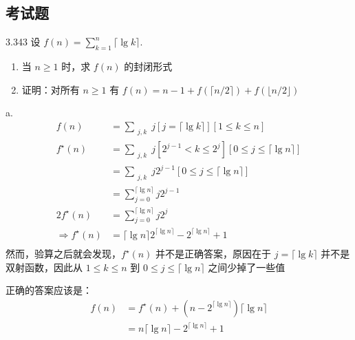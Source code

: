 \subsection{考试题}

\begin{problem}{3.34}{3}
  设 \( f(n) = \sum_{k=1}^n \lceil \lg{k} \rceil. \)
  \begin{enumerate}
    \item[a] 当 \( n \ge 1 \) 时，求 \( f(n) \) 的封闭形式
    \item[b] 证明：对所有 \( n \ge 1 \) 有 \( f(n) = n - 1 + f(\lceil n/2 \rceil) + f(\lfloor n/2 \rfloor) \)
  \end{enumerate}
\end{problem}

a.
\begin{align*}
  f(n) &= \sum_{\substack{j, k}} j [j = \lceil \lg{k} \rceil] [1 \le k \le n] \\
  f^\star (n) &= \sum_{\substack{j, k}} j [2^{j-1} < k \le 2^j] [0 \le j \le \lceil \lg{n} \rceil] \\
  &= \sum_{\substack{j, k}} j 2^{j-1} [0 \le j \le \lceil \lg{n} \rceil] \\
  &= \sum_{j=0}^{\lceil \lg{n} \rceil} j 2^{j-1} \\
  2f^\star (n) &= \sum_{j=0}^{\lceil \lg{n} \rceil} j 2^j \\
  \Rightarrow f^\star (n) &= \lceil \lg{n} \rceil 2^{\lceil \lg{n} \rceil} - 2^{\lceil \lg{n} \rceil} + 1 \\
\end{align*}
然而，验算之后就会发现，\( f^\star (n) \) 并不是正确答案，原因在于 \( j = \lceil \lg{k} \rceil \) 并不是双射函数，因此从 \( 1 \le k \le n \) 到 \( 0 \le j \le \lceil \lg{n} \rceil \) 之间少掉了一些值

正确的答案应该是：
\begin{align*}
  f(n) &= f^\star (n) +  (n - 2^{\lceil \lg{n} \rceil}) \lceil \lg{n} \rceil\\
  &= n \lceil \lg{n} \rceil - 2^{\lceil \lg{n} \rceil} + 1
\end{align*}

